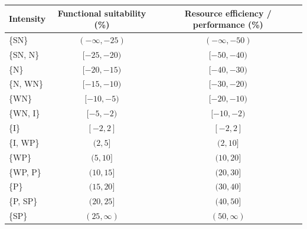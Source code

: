 \begin{tabular}{@{}lcc@{}}
\toprule
\textbf{Intensity} & \textbf{Functional suitability (\%)} & \textbf{Resource efficiency / performance (\%)} \\
\midrule
\{SN\} & $(-\infty,-25)$ & $(-\infty,-50)$ \\
\{SN, N\} & $[-25,-20)$ & $[-50,-40)$ \\
\{N\} & $[-20,-15)$ & $[-40,-30)$ \\
\{N, WN\} & $[-15,-10)$ & $[-30,-20)$ \\
\{WN\} & $[-10,-5)$ & $[-20,-10)$ \\
\{WN, I\} & $[-5,-2)$ & $[-10,-2)$ \\
\{I\} & $[-2,2]$ & $[-2,2]$ \\
\{I, WP\} & $(2,5]$ & $(2,10]$ \\
\{WP\} & $(5,10]$ & $(10,20]$ \\
\{WP, P\} & $(10,15]$ & $(20,30]$ \\
\{P\} & $(15,20]$ & $(30,40]$ \\
\{P, SP\} & $(20,25]$ & $(40,50]$ \\
\{SP\} & $(25,\infty)$ & $(50,\infty)$ \\
\bottomrule
\end{tabular}
